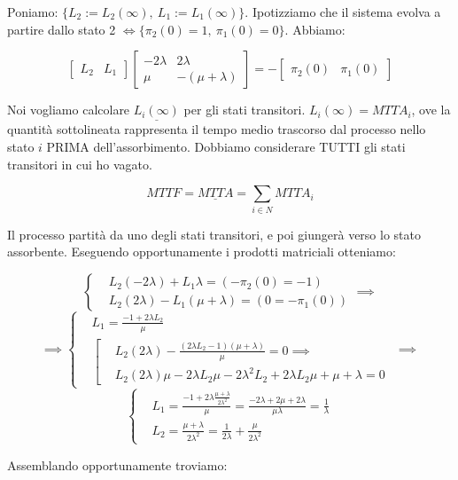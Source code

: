 Poniamo: $\{L_2 := L_2(\infty),\ L_1 := L_1(\infty)\}$. Ipotizziamo che il sistema evolva a partire dallo stato 2 $\iff \{\pi_2(0)=1,\ \pi_1(0)=0\}$. Abbiamo:

\[
	\begin{bmatrix}L_2&L_1\end{bmatrix}
	\begin{bmatrix}-2\lambda&2\lambda\\ \mu&-(\mu+\lambda)\end{bmatrix} = -\begin{bmatrix}\pi_2(0)&\pi_1(0)\end{bmatrix}
\]

Noi vogliamo calcolare $\underline{L_i(\infty)}$ per gli stati transitori. $L_i(\infty)=MTTA_i$, ove la quantità sottolineata rappresenta il tempo medio trascorso dal processo nello stato $i$ PRIMA dell'assorbimento. Dobbiamo considerare TUTTI gli stati transitori in cui ho vagato.

\[
	MTTF = \underline{MTTA} = \sum_{i\in N}{MTTA_i}
\]

Il processo partità da uno degli stati transitori, e poi giungerà verso lo stato assorbente. Eseguendo opportunamente i prodotti matriciali otteniamo:

\[
	\left\{
	\begin{aligned}
	&L_2(-2\lambda) + L_1\lambda = (-\pi_2(0) = -1)\\
	&L_2(2\lambda) - L_1(\mu+\lambda) = (0 = -\pi_1(0))
	\end{aligned}
	\right. \implies
\]
\[
	\implies \left\{ \begin{aligned}
	&L_1 = \frac{-1+2\lambda L_2}{\mu}\\
	&\left[ \begin{aligned}
	&L_2(2\lambda) - \frac{(2\lambda L_2 -1)(\mu+\lambda)}{\mu} = 0 \implies \\
	&L_2(2\lambda)\mu - 2\lambda L_2\mu -2\lambda^2 L_2 + 2\lambda L_2\mu + \mu +\lambda = 0\end{aligned}\right. \end{aligned}\right. \implies
\]
\[
	\left\{
	\begin{aligned}
	&L_1 = \frac{-1+2\lambda\frac{\mu+\lambda}{2\lambda^2}}{\mu} = \frac{-2\lambda + 2\mu +2\lambda}{\mu\lambda} = \frac{1}{\lambda}\\
	&L_2 = \frac{\mu+\lambda}{2\lambda^2} = \frac{1}{2\lambda}+\frac{\mu}{2\lambda^2}
	\end{aligned}
	\right.
\]

Assemblando opportunamente troviamo: 

